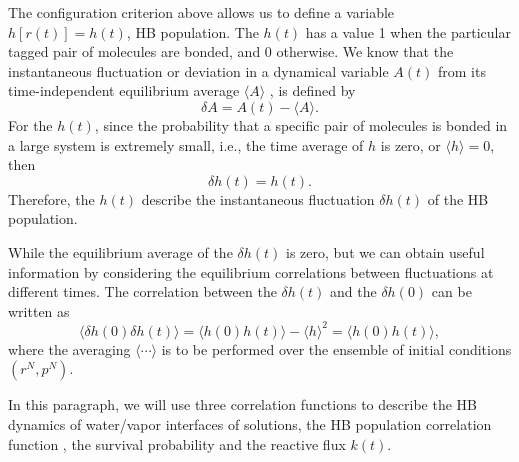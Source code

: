 The configuration criterion above allows us to define a variable $h[r(t)] = h(t)$, HB population. 
The $h(t)$ has a value 1 when the particular tagged pair of molecules are bonded, and 0 otherwise. 
We know that the instantaneous fluctuation or deviation in a dynamical variable $A(t)$ from its time-independent equilibrium average $\langle A\rangle$ , 
is defined by \cite{DC87} 
$$
\delta A = A(t) - \langle A\rangle.
$$
For the $h(t)$, since the probability that a specific pair of molecules is bonded in a large system is extremely small, i.e., 
the time average of $h$ is zero, or  
$\langle h \rangle = 0$,
then
$$
\delta h(t) = h(t).
$$
Therefore, the $h(t)$ describe the instantaneous fluctuation $\delta h(t)$  of the HB population.  

While the equilibrium average of the $\delta h(t)$ is zero, but we can obtain useful information by considering the equilibrium 
correlations between fluctuations at different times. The correlation between the $\delta h(t)$ and the $\delta h(0)$ can be written as 
$$
\langle \delta h(0) \delta h(t)\rangle = \langle h(0)h(t)\rangle-\langle h \rangle^2 = \langle h(0)h(t)\rangle,
$$
where the averaging $\langle\cdots\rangle$ is to be performed over the ensemble of initial conditions $(r^N, p^N)$.


In this paragraph, we will use three correlation functions to describe the HB dynamics of water/vapor interfaces of solutions,
the HB population correlation function \CHB, the survival probability \SHB and the reactive flux $k(t)$. \cite{Rapaport1983}

%

